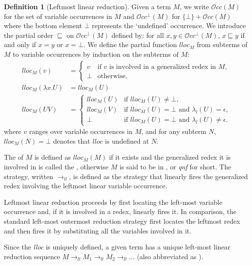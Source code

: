 \documentclass{elsarticle}
\theoremstyle{plain}
\theoremstyle{definition}
\newtheorem{definition}{Definition}[section]
\theoremstyle{remark}
\newcommand\VarOcc{\mathcal{O}{cc}}
\newcommand{\llred}{\rightarrow_{ll}}
\begin{document}
\begin{definition}[Leftmost linear reduction]
    \label{def:leftmostlinearreduction}
Given a term $M$, we write $\VarOcc(M)$ for the set of variable occurrences in $M$
and $\VarOcc^\bot(M)$ for $\{\bot \} + \VarOcc(M)$ where the bottom element $\bot$ represents the `undefined' occurrence. We introduce the partial order $\sqsubseteq$ on $\VarOcc^\bot(M)$ defined by: for all $x,y \in \VarOcc^\bot(M)$, $x \sqsubseteq y$ if and only if $x = y$ or $x = \bot$. We define the partial function $lloc_M$ from subterms of $M$ to variable occurrences by induction on the subterms of $M$:
\begin{align*}
lloc_M(v) &=
    \begin{cases}
    v &\mbox{if $v$ is involved in a generalized redex in $M$,} \\
    \bot & \mbox {otherwise.}
    \end{cases}  \\
lloc_M(\lambda x . U) &= lloc_M(U) \\
lloc_M(U V) &= \begin{cases}
                lloc_M(U) &\mbox{if $lloc_M(U)\neq\bot$,} \\
                lloc_M(V) &\mbox{if $lloc_M(U)=\bot$ and $\lambda_l(U) = \epsilon$,} \\
                \bot & \mbox{if $lloc_M(U)=\bot$ and $\lambda_l(U) \neq \epsilon$.}
              \end{cases}
\end{align*}
where $v$ ranges over variable occurrences in $M$,
and for any subterm $N$, $lloc_M(N) = \bot$ denotes that $lloc$ is undefined at $N$.

The  of $M$
is defined as $lloc_M(M)$ if it exists and the generalized redex it is involved in is called the , otherwise $M$ is said to be in , or \emph{qnf} for short.
The  strategy, written $\llred$, is defined as the strategy that linearly fires the generalized redex involving the leftmost linear variable occurrence.
\end{definition}
Leftmost linear reduction proceeds by first locating the left-most variable occurrence and, if it is involved in a redex, linearly fires it. In comparison, the standard left-most outermost reduction strategy first locates the leftmost redex and then fires it by substituting all the variables involved in it.

Since the \emph{lloc} is uniquely defined, a given term has a unique left-most linear reduction sequence $M \llred M_1 \llred M_2 \llred \ldots$ (also abbreviated as ).
\end{document}
